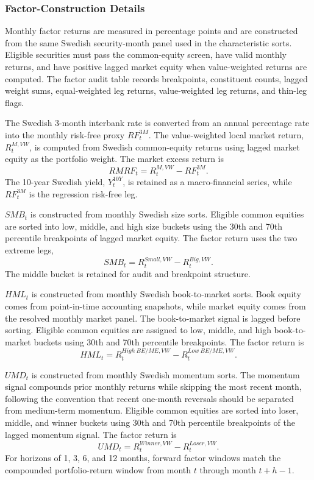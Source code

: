 \documentclass[11pt]{article}
\newcommand{\var}[1]{\ensuremath{#1}}
\begin{document}
\subsubsection{Factor-Construction Details}
\label{app:factor_construction_details}

Monthly factor returns are measured in percentage points and are constructed from the same Swedish security-month panel used in the characteristic sorts. Eligible securities must pass the common-equity screen, have valid monthly returns, and have positive lagged market equity when value-weighted returns are computed. The factor audit table records breakpoints, constituent counts, lagged weight sums, equal-weighted leg returns, value-weighted leg returns, and thin-leg flags.

The Swedish 3-month interbank rate is converted from an annual percentage rate into the monthly risk-free proxy \var{RF^{3M}_t}. The value-weighted local market return, \var{R^{M,VW}_t}, is computed from Swedish common-equity returns using lagged market equity as the portfolio weight. The market excess return is
\begin{equation}
    RMRF_t = R^{M,VW}_t - RF^{3M}_t.
\end{equation}
The 10-year Swedish yield, \var{Y^{10Y}_t}, is retained as a macro-financial series, while \var{RF^{3M}_t} is the regression risk-free leg.

\var{SMB_t} is constructed from monthly Swedish size sorts. Eligible common equities are sorted into low, middle, and high size buckets using the 30th and 70th percentile breakpoints of lagged market equity. The factor return uses the two extreme legs,
\begin{equation}
    SMB_t = R^{Small,VW}_t - R^{Big,VW}_t.
\end{equation}
The middle bucket is retained for audit and breakpoint structure.

\var{HML_t} is constructed from monthly Swedish book-to-market sorts. Book equity comes from point-in-time accounting snapshots, while market equity comes from the resolved monthly market panel. The book-to-market signal is lagged before sorting. Eligible common equities are assigned to low, middle, and high book-to-market buckets using 30th and 70th percentile breakpoints. The factor return is
\begin{equation}
    HML_t = R^{High\ BE/ME,VW}_t - R^{Low\ BE/ME,VW}_t.
\end{equation}

\var{UMD_t} is constructed from monthly Swedish momentum sorts. The momentum signal compounds prior monthly returns while skipping the most recent month, following the convention that recent one-month reversals should be separated from medium-term momentum. Eligible common equities are sorted into loser, middle, and winner buckets using 30th and 70th percentile breakpoints of the lagged momentum signal. The factor return is
\begin{equation}
    UMD_t = R^{Winner,VW}_t - R^{Loser,VW}_t.
\end{equation}
For horizons of 1, 3, 6, and 12 months, forward factor windows match the compounded portfolio-return window from month \var{t} through month \var{t+h-1}.
\end{document}
